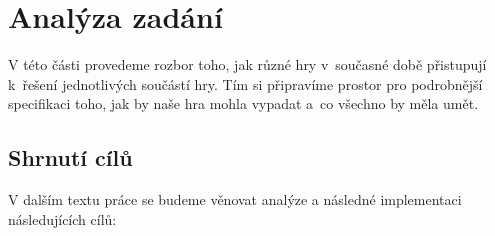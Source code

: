 
\chapter{Analýza zadání}
\label{chap:analyza}

V této části provedeme rozbor toho, jak různé hry v~současné době přistupují k~řešení jednotlivých součástí hry. Tím si připravíme prostor pro podrobnější specifikaci toho, jak by naše hra mohla vypadat a~co všechno by měla umět.







\pagebreak
\section{Shrnutí cílů}

V dalším textu práce se budeme věnovat analýze a následné implementaci následujících cílů:

